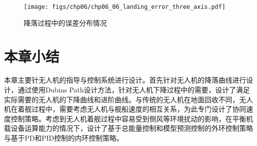 \begin{figure}[!tb]
	\centering
	\texttt{[image: figs/chp06/chp06\_06\_landing\_error\_three\_axis.pdf]}	
	\caption{降落过程中的误差分布情况}
	\label{fig:chp06_06_landing_error_three_axis}
\end{figure}

\section{本章小结}
本章主要针无人机的指导与控制系统进行设计。首先针对无人机的降落曲线进行设计，通过使用Dubins Path设计方法，针对无人机下降过程中的需要，设计了满足实际需要的无人机的下降曲线和进阶曲线。与传统的无人机在地面回收不同，无人机在着舰过程中，需要考虑无人机与舰船速度的相互关系，为此专门设计了协同速度控制策略。考虑到无人机着舰过程中容易受到侧风等环境扰动的影响，在平衡机载设备运算能力的情况下，设计了基于总能量控制和模型预测控制的外环控制策略与基于PD和PID控制的内环控制策略。

